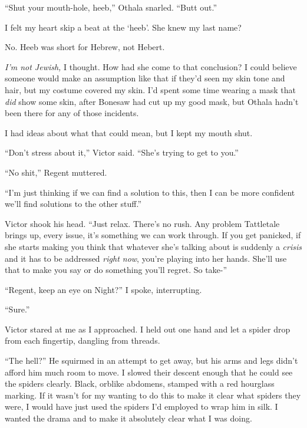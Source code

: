 ``Shut your mouth-hole, heeb,'' Othala snarled.  ``Butt out.''



I felt my heart skip a beat at the `heeb'.  She knew my last name?



No.  Heeb was short for Hebrew, not Hebert.



\emph{I'm not Jewish,} I thought.  How had she come to that conclusion?  I could believe someone would make an assumption like that if they'd seen my skin tone and hair, but my costume covered my skin.  I'd spent some time wearing a mask that \emph{did} show some skin, after Bonesaw had cut up my good mask, but Othala hadn't been there for any of those incidents.



I had ideas about what that could mean, but I kept my mouth shut.



``Don't stress about it,'' Victor said.  ``She's trying to get to you.''



``No shit,'' Regent muttered.



``I'm just thinking if we can find a solution to this, then I can be more confident we'll find solutions to the other stuff.''



Victor shook his head.  ``Just relax.  There's no rush.  Any problem Tattletale brings up, every issue, it's something we can work through.  If you get panicked, if she starts making you think that whatever she's talking about is suddenly a \emph{crisis} and it has to be addressed \emph{right now}, you're playing into her hands.  She'll use that to make you say or do something you'll regret.  So take-''



``Regent, keep an eye on Night?''  I spoke, interrupting.



``Sure.''



Victor stared at me as I approached.  I held out one hand and let a spider drop from each fingertip, dangling from threads.



``The hell?'' He squirmed in an attempt to get away, but his arms and legs didn't afford him much room to move. I slowed their descent enough that he could see the spiders clearly.  Black, orblike abdomens, stamped with a red hourglass marking.  If it wasn't for my wanting to do this to make it clear what spiders they were, I would have just used the spiders I'd employed to wrap him in silk.  I wanted the drama and to make it absolutely clear what I was doing.




